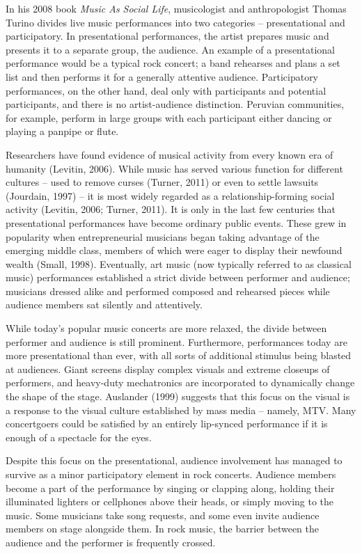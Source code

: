 In his 2008 book \textit{Music As Social Life}, musicologist and anthropologist Thomas Turino divides live music performances into two categories -- presentational and participatory. In presentational performances, the artist prepares music and presents it to a separate group, the audience. An example of a presentational performance would be a typical rock concert; a band rehearses and plans a set list and then performs it for a generally attentive audience. Participatory performances, on the other hand, deal only with participants and potential participants, and there is no artist-audience distinction. Peruvian communities, for example, perform in large groups with each participant either dancing or playing a panpipe or flute.

Researchers have found evidence of musical activity from every known era of humanity (Levitin, 2006). While music has served various function for different cultures -- used to remove curses (Turner, 2011) or even to settle lawsuits (Jourdain, 1997) -- it is most widely regarded as a relationship-forming social activity (Levitin, 2006; Turner, 2011). It is only in the last few centuries that presentational performances have become ordinary public events. These grew in popularity when entrepreneurial musicians began taking advantage of the emerging middle class, members of which were eager to display their newfound wealth (Small, 1998). Eventually, art music (now typically referred to as classical music) performances established a strict divide between performer and audience; musicians dressed alike and performed composed and rehearsed pieces while audience members sat silently and attentively.

While today's popular music concerts are more relaxed, the divide between performer and audience is still prominent. Furthermore, performances today are more presentational than ever, with all sorts of additional stimulus being blasted at audiences. Giant screens display complex visuals and extreme closeups of performers, and heavy-duty mechatronics are incorporated to dynamically change the shape of the stage. Auslander (1999) suggests that this focus on the visual is a response to the visual culture established by mass media -- namely, MTV. Many concertgoers could be satisfied by an entirely lip-synced performance if it is enough of a spectacle for the eyes.

Despite this focus on the presentational, audience involvement has managed to survive as a minor participatory element in rock concerts. Audience members become a part of the performance by singing or clapping along, holding their illuminated lighters or cellphones above their heads, or simply moving to the music. Some musicians take song requests, and some even invite audience members on stage alongside them. In rock music, the barrier between the audience and the performer is frequently crossed.

